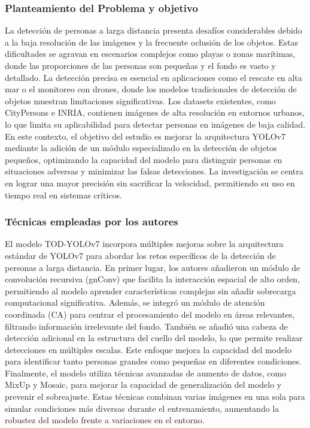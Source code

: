 \subsubsection{Planteamiento del Problema y objetivo }
La detección de personas a larga distancia presenta desafíos considerables debido a la baja resolución de las imágenes y la frecuente oclusión de los objetos. Estas dificultades se agravan en escenarios complejos como playas o zonas marítimas, donde las proporciones de las personas son pequeñas y el fondo es vasto y detallado. La detección precisa es esencial en aplicaciones como el rescate en alta mar o el monitoreo con drones, donde los modelos tradicionales de detección de objetos muestran limitaciones significativas. Los datasets existentes, como CityPersons e INRIA, contienen imágenes de alta resolución en entornos urbanos, lo que limita su aplicabilidad para detectar personas en imágenes de baja calidad. En este contexto, el objetivo del estudio es mejorar la arquitectura YOLOv7 mediante la adición de un módulo especializado en la detección de objetos pequeños, optimizando la capacidad del modelo para distinguir personas en situaciones adversas y minimizar las falsas detecciones. La investigación se centra en lograr una mayor precisión sin sacrificar la velocidad, permitiendo su uso en tiempo real en sistemas críticos.






\subsubsection{Técnicas empleadas por los autores}
El modelo TOD-YOLOv7 incorpora múltiples mejoras sobre la arquitectura estándar de YOLOv7 para abordar los retos específicos de la detección de personas a larga distancia. En primer lugar, los autores añadieron un módulo de convolución recursiva (gnConv) que facilita la interacción espacial de alto orden, permitiendo al modelo aprender características complejas sin añadir sobrecarga computacional significativa. Además, se integró un módulo de atención coordinada (CA) para centrar el procesamiento del modelo en áreas relevantes, filtrando información irrelevante del fondo. También se añadió una cabeza de detección adicional en la estructura del cuello del modelo, lo que permite realizar detecciones en múltiples escalas. Este enfoque mejora la capacidad del modelo para identificar tanto personas grandes como pequeñas en diferentes condiciones. Finalmente, el modelo utiliza técnicas avanzadas de aumento de datos, como MixUp y Mosaic, para mejorar la capacidad de generalización del modelo y prevenir el sobreajuste. Estas técnicas combinan varias imágenes en una sola para simular condiciones más diversas durante el entrenamiento, aumentando la robustez del modelo frente a variaciones en el entorno.





